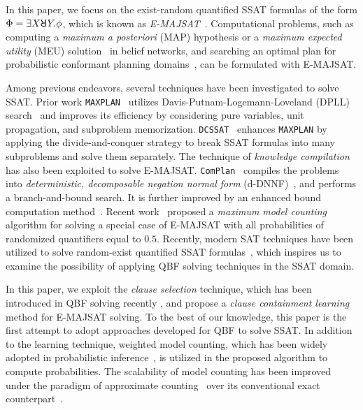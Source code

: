     In this paper, we focus on the exist-random quantified SSAT formulas of the form $\Phi=\exists X \random{} Y.\phi$, which is known as \emph{E-MAJSAT}~\cite{Littman1998}.
    Computational problems, such as computing a \textit{maximum a posteriori}
    (MAP) hypothesis or a \textit{maximum expected utility} (MEU) solution~\cite{Dechter1998} in belief networks, and searching an optimal plan for probabilistic conformant planning domains~\cite{Littman1998}, can be formulated with E-MAJSAT.

    Among previous endeavors, several techniques have been investigated to solve SSAT.
    Prior work \texttt{MAXPLAN}~\cite{Majercik1998} utilizes Davis-Putnam-Logemann-Loveland (DPLL) search~\cite{Davis1962} and improves its efficiency by considering pure variables, unit propagation, and subproblem memorization.
    \texttt{DCSSAT}~\cite{Majercik2005} enhances \texttt{MAXPLAN} by applying the divide-and-conquer strategy to break SSAT formulas into many subproblems and solve them separately.
    The technique of \textit{knowledge compilation} has also been exploited to solve E-MAJSAT.
    \texttt{ComPlan}~\cite{Huang2006} compiles the problems into \textit{deterministic, decomposable negation normal form} (d-DNNF)~\cite{Darwiche2001,Darwiche2002dDNNF}, and performs a branch-and-bound search.
    It is further improved by an enhanced bound computation method~\cite{Pipatsrisawat2009}.
    Recent work~\cite{Fremont2017} proposed a \textit{maximum model counting} algorithm for solving a special case of E-MAJSAT with all probabilities of randomized quantifiers equal to $0.5$.
    Recently, modern SAT techniques have been utilized to solve random-exist quantified SSAT formulas~\cite{LeeIJCAI17RESSAT}, which inspires us to examine the possibility of applying QBF solving techniques in the SSAT domain.

    In this paper, we exploit the \textit{clause selection} technique, which has been introduced in QBF solving recently \cite{Janota2015,Rabe2015}, and
    propose a \textit{clause containment learning} method for E-MAJSAT solving.
    To the best of our knowledge, this paper is the first attempt to adopt approaches developed for QBF to solve SSAT.
    In addition to the learning technique, weighted model counting, which has been widely adopted in probabilistic inference~\cite{Sang2005BayesianInference,Chavira2008}, is utilized in the proposed algorithm to compute probabilities.
    The scalability of model counting has been improved under the paradigm of approximate counting~\cite{Chakraborty2016} over its conventional exact counterpart~\cite{Sang2004,Sang2005ModelCounting}.

